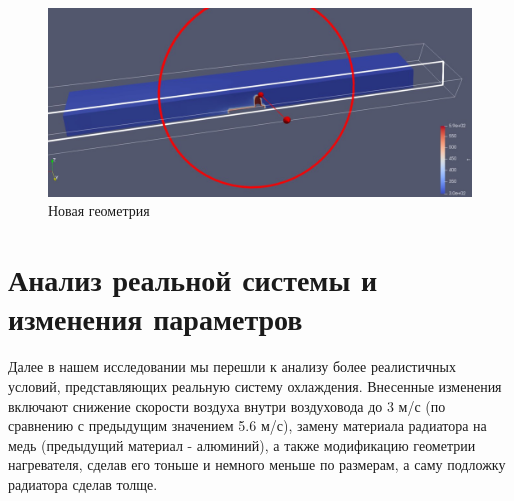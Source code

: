 \documentclass[a4paper,12pt]{article}
\theoremstyle{plain} %
\theoremstyle{definition} %
\theoremstyle{remark} %
\begin{document}
\begin{figure}[h]
	\begin{center}
		\includegraphics[width=0.4\linewidth]{22.4.jpg}
		\caption{Новая геометрия} %
	\end{center}
\end{figure}

\section{Анализ реальной системы и изменения параметров}

Далее в нашем исследовании мы перешли к анализу более реалистичных условий, представляющих реальную систему охлаждения. Внесенные изменения включают снижение скорости воздуха внутри воздуховода до 3 м/с (по сравнению с предыдущим значением 5.6 м/с), замену материала радиатора на медь (предыдущий материал - алюминий), а также модификацию геометрии нагревателя, сделав его тоньше и немного меньше по размерам, а саму подложку радиатора сделав толще.
\end{document}
